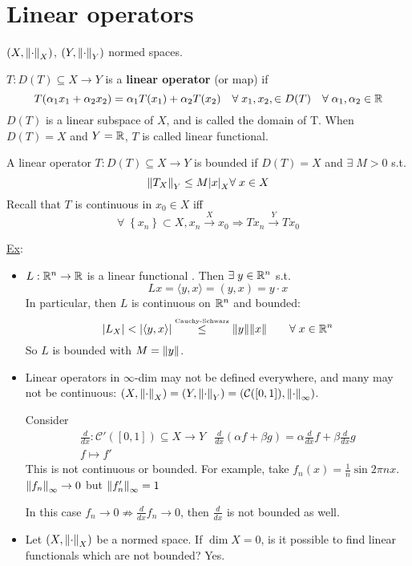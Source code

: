 \section{Linear operators}
\((X, \norm{\cdot}_X)\), \((Y, \norm{\cdot}_Y)\) normed spaces.
\begin{definition}
    \(T : D(T) \subseteq X \to Y\) is a \textbf{linear operator} (or map) if 
    \[
        T(\alpha_1 x_1 + \alpha_2 x_2) = \alpha_1 T(x_1) + \alpha_2 T(x_2) \quad \forall \; x_1, x_2, \in D(T) \quad \forall \; \alpha_1, \alpha_2 \in \mathbb{R}
    \]
    \(D(T)\) is a linear subspace of \(X\), and is called the domain of T. When \(D(T) = X\) and \(Y = \mathbb{R}\), \(T\) is called linear functional.
\end{definition}
\begin{definition}
    A linear operator \(T : D(T) \subseteq X \to Y\) is bounded if \(D(T) = X\) and \(\exists \; M >0\) s.t. 
    \[
        \norm{T_X}_Y \leq M \abs{x}_X \forall \; x \in X
    \]
    Recall that \(T\) is continuous in \(x_0 \in X\) iff 
    \[
        \forall \; \left\{ x_n \right\} \subset X, x_n \overset{X}{\to} x_0 \Rightarrow Tx_n \overset{Y}{\to} Tx_0
    \]
\end{definition}
\noindent\underline{Ex}:
\begin{itemize}
    \item \(L: \mathbb{R}^n \to \mathbb{R}\)  is a linear functional . Then \(\exists \; y \in \mathbb{R}^n\) s.t. 
    \[
        Lx = \langle y, x \rangle = (y, x) = y \cdot x
    \]
    In particular, then \(L\) is continuous on \(\mathbb{R}^n\) and bounded:
    \[
        \abs{L_X} < \abs{\langle y,x \rangle} \overset{\text{\tiny{Cauchy-Schwarz}}}{\leq} \norm{y} \norm{x} \qquad \forall\; x \in \mathbb{R}^n
    \]
    So \(L\) is bounded with \(M=\norm{y}\).

    \item Linear operators in \(\infty\)-dim may not be defined everywhere, and many may not be continuous:
    \((X, \norm{\cdot}_X) = (Y, \norm{\cdot}_Y) = (\mathcal{C}([0, 1]), \norm{\cdot}_\infty)\).
    
    Consider 
    \[
        \begin{array}{cc}
            \frac{d}{dx}: \mathcal{C}'([0,1]) \subseteq X \to Y & \frac{d}{dx}(\alpha f + \beta g) = \alpha \frac{d}{dx}f + \beta \frac{d}{dx} g \\
            f \mapsto f'
        \end{array}
    \]
    This is not continuous or bounded. For example, take \(f_n(x) = \frac{1}{n} \sin{2\pi n x}\). \(\norm{f_n}_\infty \to 0\) but \(\norm{f_n'}_\infty =1\)

    In this case \(f_n \to 0 \nRightarrow \frac{d}{dx} f_n \to 0\), then \(\frac{d}{dx} \) is not bounded as well.
    \item Let \((X, \norm{\cdot}_X)\) be a normed space. If \(\dim X = 0\), is it possible to find linear functionals which are not bounded? Yes.
\end{itemize}
